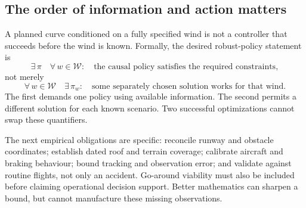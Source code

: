 \subsection*{The order of information and action matters}
A planned curve conditioned on a fully specified wind is not a controller that succeeds before the wind is known. Formally, the desired robust-policy statement is
\[
\exists\,\pi\quad\forall\,w\in\mathcal W:\quad
\text{the causal policy satisfies the required constraints},
\]
not merely
\[
\forall\,w\in\mathcal W\quad\exists\,\pi_w:\quad
\text{some separately chosen solution works for that wind}.
\]
The first demands one policy using available information. The second permits a different solution for each known scenario. Two successful optimizations cannot swap these quantifiers.

The next empirical obligations are specific: reconcile runway and obstacle coordinates; establish dated roof and terrain coverage; calibrate aircraft and braking behaviour; bound tracking and observation error; and validate against routine flights, not only an accident. Go-around viability must also be included before claiming operational decision support. Better mathematics can sharpen a bound, but cannot manufacture these missing observations.
\par\medskip
